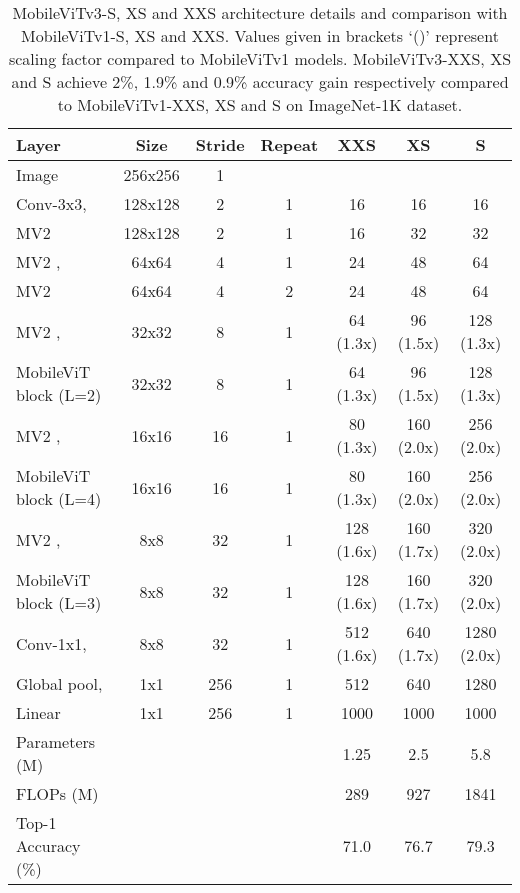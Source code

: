 \documentclass{article} \usepackage{iclr2022_conference,times}
\begin{document}
\begin{table}[h] \scriptsize
\centering
\begin{tabular}{lcccccc} \toprule[1.5pt]
    {Layer} & {Size} & {Stride} & {Repeat}& {XXS} & {XS} & {S} \\ 
    \midrule[1.5pt]
    Image          & 256x256  & 1   &   &    &    &    \\
    \midrule
    Conv-3x3,   & 128x128   & 2   & 1  & 16    & 16    & 16    \\
    MV2                      & 128x128   & 2   & 1  & 16    & 32    & 32    \\
    \midrule
    MV2     ,   & 64x64     & 4   & 1  & 24    & 48    & 64    \\
    MV2                      & 64x64     & 4   & 2  & 24    & 48    & 64    \\
    \midrule
    MV2     ,   & 32x32     & 8   & 1  & 64 (1.3x)  & 96 (1.5x)    & 128 (1.3x)   \\
    MobileViT block (L=2)    & 32x32     & 8   & 1  & 64 (1.3x)  & 96 (1.5x)    & 128 (1.3x)   \\
    \midrule
    MV2     ,   & 16x16     & 16  & 1  & 80 (1.3x)  & 160 (2.0x)    & 256 (2.0x) \\
    MobileViT block (L=4)    & 16x16     & 16  & 1  & 80 (1.3x)  & 160 (2.0x)    & 256 (2.0x) \\
    \midrule
    MV2     ,   & 8x8       & 32  & 1  & 128 (1.6x)  & 160 (1.7x)   & 320 (2.0x) \\
    MobileViT block (L=3)    & 8x8       & 32  & 1  & 128 (1.6x)  & 160 (1.7x)   & 320 (2.0x) \\
    \midrule
    Conv-1x1,                & 8x8       & 32  & 1  & 512 (1.6x)   & 640  (1.7x)   & 1280 (2.0x)   \\
    \midrule
    Global pool,             & 1x1       & 256 & 1  & 512   & 640   & 1280   \\
    Linear                   & 1x1       & 256 & 1  & 1000  & 1000  & 1000  \\
    \midrule[1.5pt]
    Parameters (M)           &           &     &    & 1.25   & 2.5   & 5.8   \\
    FLOPs (M)                &           &     &    & 289   & 927   & 1841   \\
    \midrule[1.5pt]
    Top-1 Accuracy (\%)      &           &     &    & 71.0   & 76.7   & 79.3   \\


    \bottomrule[1.5pt]
\end{tabular}
\caption{MobileViTv3-S, XS and XXS architecture details and comparison with MobileViTv1-S, XS and XXS. Values given in brackets `()' represent scaling factor compared to MobileViTv1 models. MobileViTv3-XXS, XS and S achieve 2\%, 1.9\% and 0.9\% accuracy gain respectively compared to MobileViTv1-XXS, XS and S on ImageNet-1K dataset.}
\label{table1:fullarch}
\end{table}
\end{document}
